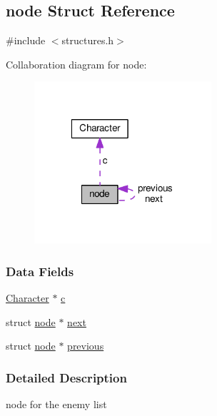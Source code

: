 \hypertarget{structnode}{\subsection{node Struct Reference}
\label{structnode}
}


{\ttfamily \#include $<$structures.\-h$>$}



Collaboration diagram for node\-:\nopagebreak
\begin{figure}[H]
\begin{center}
\leavevmode
\includegraphics[width=186pt]{structnode__coll__graph}
\end{center}
\end{figure}
\subsubsection*{Data Fields}
\begin{DoxyCompactItemize}
\item 
\hyperlink{struct_character}{Character} $\ast$ \hyperlink{structnode_af76e20a507ad8fd205b860bab7ba4416}{c}
\item 
struct \hyperlink{structnode}{node} $\ast$ \hyperlink{structnode_a0dc1b6470487aa86d9936e3cab8b95be}{next}
\item 
struct \hyperlink{structnode}{node} $\ast$ \hyperlink{structnode_aba783da56f092df6846bd3b7b9555728}{previous}
\end{DoxyCompactItemize}


\subsubsection{Detailed Description}
node for the enemy list 

